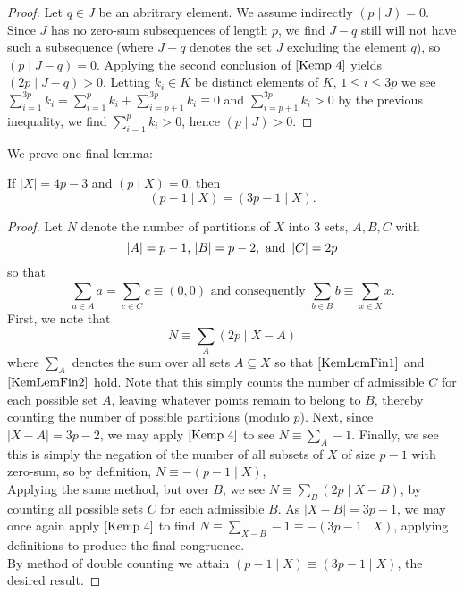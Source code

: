 \begin{proof}
	Let \(q \in J\) be an abritrary element. We assume indirectly \(\left( p \mid J \right) = 0\). Since \(J\) has no zero-sum subsequences of length \(p\), we find \(J -q\) still will not have such a subsequence (where \(J - q\) denotes the set \(J\) excluding the element \(q\)), so \(\left( p \mid J - q \right) = 0\). Applying the second conclusion of \(\ref{Kemp 4}\) yields \(\left( 2p \mid J - q \right) > 0\). Letting \(k_{i} \in K\) be distinct elements of \(K\), \(1 \le i \le 3p\) we see \(\sum_{i= 1}^{3p} k_{i} = \sum_{i= 1}^{p} k_{i} + \sum_{i=p+1}^{3p} k_{i} \equiv 0\) and \(\sum_{i=p+1}^{3p} k_{i} > 0\) by the previous inequality, we find \(\sum_{i= 1}^{p} k_{i} > 0\), hence \(\left( p \mid J \right) > 0\).
\end{proof}
We prove one final lemma:
\begin{lemma}\label{KemLemFin}
	If \(\left| X \right| = 4p-3\) and \(\left( p \mid X \right) = 0\), then \begin{equation}\label{KemLemFin 0}\left( p-1\mid X \right) = \left( 3p-1 \mid X \right) . \end{equation}
\end{lemma}
\begin{proof}
	Let \(N\) denote the number of partitions of \(X\) into \(3\) sets, \(A, B, C\) with \begin{equation}\label{KemLemFin1}\left| A \right| = p-1\), \(\left| B \right| = p-2,\text{ and }  \left| C \right| =2p\end{equation} so that \begin{equation} \label{KemLemFin2}\sum_{a \in A}^{} a = \sum_{c \in C}^{} c \equiv \left( 0, 0 \right) \text{ and consequently } \sum_{b \in B}^{} b \equiv \sum_{x \in X}^{} x.\end{equation}
	First, we note that \[N \equiv \sum_{A}   \left( 2p \mid X - A \right)  \] where \(\sum_{A}^{} \) denotes the sum over all sets \(A \subseteq X\) so that \(\ref{KemLemFin1}\) and \(\ref{KemLemFin2}\) hold. Note that this simply counts the number of admissible \(C\) for each possible set \(A\), leaving whatever points remain to belong to \(B\), thereby counting the number of possible partitions (modulo \(p\)). Next, since \(\left| X - A \right| = 3p-2\), we may apply \(\ref{Kemp 4}\) to see \(N \equiv \sum_{A}^{} -1\). Finally, we see this is simply the negation of the number of all subsets of \(X\) of size \(p-1\) with zero-sum, so by definition, \(N \equiv - \left( p-1 \mid X\right) \),\\
	Applying the same method, but over \(B\), we see \(N \equiv \sum_{B}^{} \left( 2p \mid X - B \right) \), by counting all possible sets \(C\) for each admissible \(B\). As \(\left| X - B \right| = 3p-1\), we may once again apply \(\ref{Kemp 4}\) to find \(N \equiv \sum_{X - B}^{} -1 \equiv - \left( 3p-1 \mid X \right) \), applying definitions to produce the final congruence.\\
	By method of double counting we attain \(\left( p-1 \mid X \right) \equiv \left( 3p-1  \mid X \right) \), the desired result.
\end{proof}
